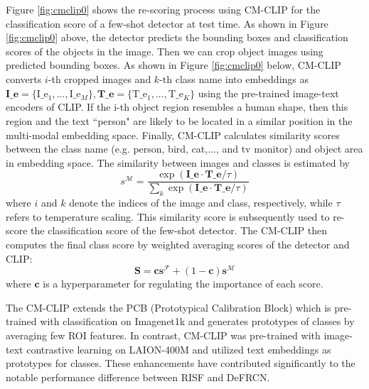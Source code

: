 \documentclass{article}
\begin{document}
Figure \ref{fig:cmclip0} shows the re-scoring process using CM-CLIP for the classification score of a few-shot detector at test time.
As shown in Figure \ref{fig:cmclip0} above, the detector predicts the bounding boxes and classification scores of the objects in the image. 
Then we can crop object images using predicted bounding boxes. As shown in Figure \ref{fig:cmclip0} below, CM-CLIP converts $i$-th cropped images and $k$-th class name into embeddings as $\mathbf{I\_e} = \{\text{I\_e}_1,...,\text{I\_e}_M\}, \mathbf{T\_e} = \{ \text{T\_e}_1,..., \text{T\_e}_K\}$ using the pre-trained image-text encoders of CLIP.
If the i-th object region resembles a human shape, then this region and the text ``person" are likely to be located in a similar position in the multi-modal embedding space.
Finally, CM-CLIP calculates similarity scores between the class name (e.g. person, bird, cat,..., and tv monitor) and object area in embedding space.
The similarity between images and classes is estimated by  
\begin{equation}
    {s}^{\mathcal{M}} =  \frac{\exp( \mathbf{I\_e} \cdot \mathbf{T\_e} \slash \tau  )}{\sum_k \exp(\mathbf{I\_e} \cdot \mathbf{T\_e} \slash \tau )  }
\end{equation}
where $i$ and $k$ denote the indices of the image and class, respectively, while $\tau$ refers to temperature scaling. 
This similarity score is subsequently used to re-score the classification score of the few-shot detector.  
The CM-CLIP then computes the final class score by weighted averaging scores of the detector and CLIP:
\begin{equation}
    \mathbf{S} = \mathbf{c} \mathbf{s}^\mathcal{F} + (1-\mathbf{c}) \mathbf{s}^\mathcal{M}
    \label{eq:cm-clip}
\end{equation}
where $\mathbf{c}$ is a  hyperparameter for regulating the importance of each score.

The CM-CLIP extends the PCB (Prototypical Calibration Block) \cite{defrcn} which is pre-trained with classification on Imagenet1k \cite{IMAGENET} and generates prototypes of classes by averaging few ROI features. In contrast, CM-CLIP was pre-trained with image-text contrastive learning on LAION-400M \cite{LAION} and utilized text embeddings as prototypes for classes. 
These enhancements have contributed significantly to the notable performance difference between RISF and DeFRCN.
\end{document}
